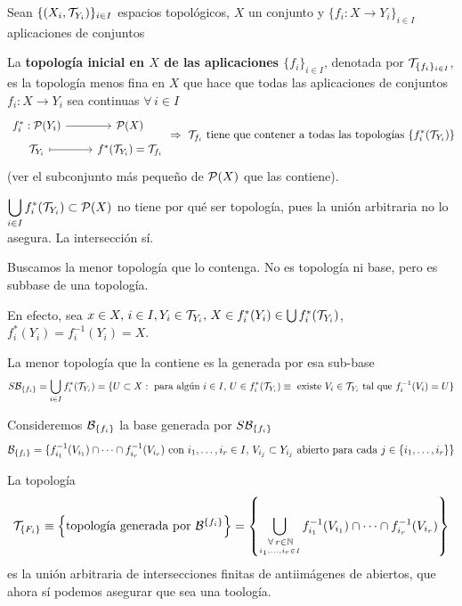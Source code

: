 Sean $\{(X_i, \mathcal{T}_{Y_i})\}_{i \in I}$ espacios topol\'ogicos, $X$ un conjunto y $\{f_i : X \longrightarrow Y_i\}_{i \in I}$ aplicaciones de conjuntos
\begin{defi}
    La \textbf{topología inicial en $X$ de las aplicaciones $\{f_i\}_{i \in I}$}, denotada por $\mathcal{T}_{\{f_i\}_{i \in I}}$, es la topolog\'ia menos fina en $X$ que hace que todas las aplicaciones de conjuntos $f_i: X \longrightarrow Y_i$ sea continuas $\forall \, i \in I$
    $$\bt f^*_i : \mc P(Y_i) \rar & \mc P(X) \\[-5mm] \mc T_{Y_i} \rarmaps & f^*(\mc T_{Y_i}) = \mc T_{f_i} \et \Rightarrow   \, \, \mc T_{f_i} \text{ tiene que contener a todas las topolog\'ias } \{f^*_i(\mc T_{Y_i})\}$$
    (ver el subconjunto m\'as pequeño de $\mathcal{P}(X)$ que las contiene).
\end{defi} 
\begin{obs}
    $\displaystyle \bigcup_{i \in I} f_i^*(\mathcal{T}_{Y_i}) \subset \mathcal{P}(X)$ no tiene por qu\'e ser topolog\'ia, pues la uni\'on arbitraria no lo asegura. La intersecci\'on s\'i.

    Buscamos la menor topolog\'ia que lo contenga. No es topolog\'ia ni base, pero es subbase de una topolog\'ia. 

    En efecto, sea $x\in X, \, i \in I, Y_i \in \mathcal{T}_{Y_i}, \, X\in f_i^*(Y_i) \in \bigcup f_i^*(\mathcal{T}_{Y_i})$, $f_i^*(Y_i) = f_i^{-1}(Y_i)=X$.

    La menor topolog\'ia que la contiene es la generada por esa sub-base 
    $$S\mathcal{B}_{\{f_i\}} = \bigcup_{i \in I} f_i^*(\mathcal{T}_{Y_i}) = \{ U \subset X : \text{ para alg\'un } i \in I, \, U \in f_i^*(\mathcal{T}_{Y_i}) \equiv \text{ existe } V_i \in \mathcal{T}_{Y_i} \text{ tal que } f_i^{-1}(V_i) = U\}$$

    Consideremos $\mathcal{B}_{\{f_i\}}$ la base generada por $S\mathcal{B}_{\{f_i\}}$
    $$\mathcal{B}_{\{f_i\}} = \{f_{i_1}^{-1}(V_{i_1}) \cap \cdots \cap f_{i_r}^{-1}(V_{i_r}) \text{ con } i_1, \ldots, i_r \in I, \, V_{i_j} \subset Y_{i_j}\text{ abierto para cada } j \in \{i_1, \ldots, i_r\}\}$$

    La topolog\'ia 
    $$\mathcal{T}_{\{F_i\}} \equiv \left\{ \text{topolog\'ia generada por } \mathcal{B}^{\{f_i\}} \right\} = \left\{\bigcup_{\underset{i_1, \ldots, i_r \in I}{\, \forall \, r \in \mathbb{N}}} f^{-1}_{i_1}(V_{i_1}) \cap \cdots \cap f^{-1}_{i_r}(V_{i_r})\right\}$$
    es la uni\'on arbitraria de intersecciones finitas de antiim\'agenes de abiertos, que ahora s\'i podemos asegurar que sea una toolog\'ia. 
\end{obs}

